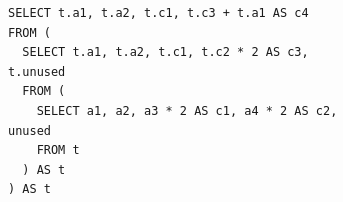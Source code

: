 \begin{figure}[htpb]
    \begin{subfigure}[b]{\textwidth}
    \begin{tcolorbox}[colback=white, colframe=black, boxrule=1pt, arc=0pt]
        \begin{verbatim}
SELECT t.a1, t.a2, t.c1, t.c3 + t.a1 AS c4
FROM (
  SELECT t.a1, t.a2, t.c1, t.c2 * 2 AS c3, t.unused
  FROM (
    SELECT a1, a2, a3 * 2 AS c1, a4 * 2 AS c2, unused
    FROM t
  ) AS t
) AS t
        \end{verbatim}
    \end{tcolorbox}
    \end{subfigure}

    \medskip

    \begin{subfigure}[c]{234pt}
        \centering
    \end{subfigure}\hfill\begin{subfigure}[c]{174pt}
        \centering
    \end{subfigure}
    

\end{figure}
